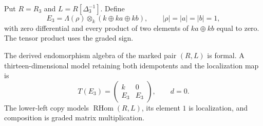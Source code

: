 Put $R=R_3$ and $L=R[\Delta_3^{-1}]$. Define
\[
 E_3=\Lambda(\rho)\otimes_k(k\oplus ka\oplus kb),
 \qquad |\rho|=|a|=|b|=1,
\]
with zero differential and every product of two
elements of $ka\oplus kb$ equal to zero.
The tensor product uses the graded sign.

\begin{proposition}\label{cbc:ac:global-pair}
The derived endomorphism algebra of the marked
pair $(R,L)$ is formal. A thirteen-dimensional
model retaining both idempotents and the
localization map is
\[
 T(E_3)=
 \begin{pmatrix}k&0\\ E_3&E_3\end{pmatrix},
 \qquad d=0.
\]
The lower-left copy models
$\operatorname{RHom}(R,L)$, its element $1$
is localization, and composition is graded
matrix multiplication.
\end{proposition}
